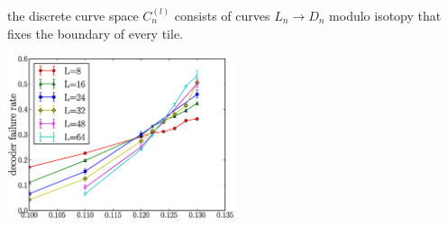 \documentclass[12pt,a4paper]{article}
\begin{document}
 the discrete curve space $C_n^(l)$ consists of
curves $L_n\to D_n$ modulo isotopy that fixes the boundary of
every tile.







\begin{center}
\includegraphics[width=0.5\textwidth]{threshold-graph.eps}
\end{center}


%

%
%
%
%
%
%
%
%
%
\end{document}
